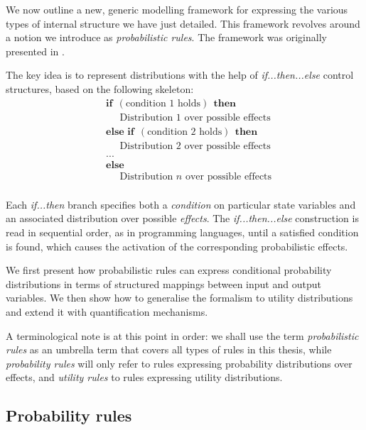 We now outline a new, generic modelling framework for expressing the various types of internal structure we have just detailed.  This framework revolves around a notion we introduce as \textit{probabilistic rules}. The framework was originally presented in \cite{rulebasedmodels-sigdial2012,lison-semdial2012}.

The key idea is to represent distributions with the help of \textit{if...then...else} control structures, based on the following skeleton:
\begin{equation*}
\begin{aligned}
& \textbf{if} \ \ (\text{condition 1 holds}) \ \ \textbf{then} \\ 
& \;\;\;\;\; \text{Distribution 1 over possible effects} \\
& \textbf{else if} \ \ (\text{condition 2 holds}) \ \ \textbf{then} \\ 
& \;\;\;\;\; \text{Distribution 2 over possible effects} \\
& ... \\
& \textbf{else} \\
& \;\;\;\;\; \text{Distribution } n \text{ over possible effects} \\ 
\end{aligned}
\label{eq:probrule}
\end{equation*}

Each \textit{if...then} branch specifies both a \textit{condition} on particular state variables and an associated distribution over possible \textit{effects}.   The \textit{if...then...else} construction is read in sequential order, as in programming languages, until a satisfied condition is found, which causes the activation of the corresponding probabilistic effects. 

We first present how probabilistic rules can express conditional probability distributions in terms of structured mappings between input and output variables.  We then show how to  generalise the formalism to utility distributions and extend it with quantification mechanisms.

A terminological note is at this point in order: we shall use the term \textit{probabilistic rules} as an umbrella term that covers all types of rules in this thesis, while \textit{probability rules} will only refer to rules expressing probability distributions over effects, and \textit{utility rules} to rules expressing utility distributions.

\subsection{Probability rules}
\label{sec:probabirules}

